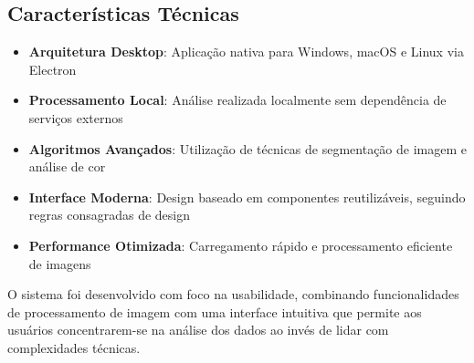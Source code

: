 \subsection{Características Técnicas}

\begin{itemize}
    \item \textbf{Arquitetura Desktop}: Aplicação nativa para Windows, macOS e Linux via Electron
    \item \textbf{Processamento Local}: Análise realizada localmente sem dependência de serviços externos
    \item \textbf{Algoritmos Avançados}: Utilização de técnicas de segmentação de imagem e análise de cor
    \item \textbf{Interface Moderna}: Design baseado em componentes reutilizáveis, seguindo regras consagradas de design
    \item \textbf{Performance Otimizada}: Carregamento rápido e processamento eficiente de imagens
\end{itemize}

O sistema foi desenvolvido com foco na usabilidade, combinando funcionalidades de processamento de imagem com uma interface intuitiva que permite aos usuários concentrarem-se na análise dos dados ao invés de lidar com complexidades técnicas. 